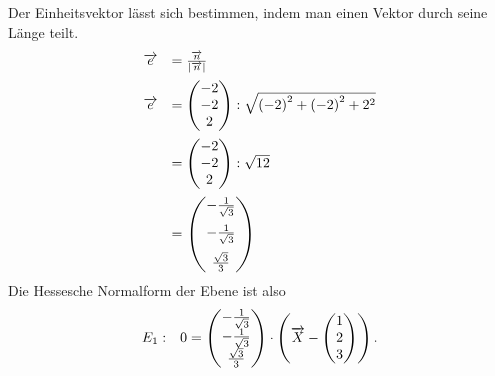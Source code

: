 Der Einheitsvektor lässt sich bestimmen, indem man einen Vektor durch seine Länge teilt.
\begin{equation*}
	\begin{array}{ r l }
		\vec{e} & =\frac{\vec{n}}{| \vec{n}| }\vspace{2mm}\\
		\vec{e} & =\begin{pmatrix}
			-2\\
			-2\\
			2
		\end{pmatrix} :\sqrt{{(-2)}^{2} + {(-2)}^{2} + {2}^{2}}\vspace{2mm}\\
		& =\begin{pmatrix}
			-2\\
			-2\\
			2
		\end{pmatrix} :\sqrt{12}\vspace{2mm}\\
		& =\begin{pmatrix}
			-\frac{1}{\sqrt{3}}\vspace{2mm}\\
			-\frac{1}{\sqrt{3}}\vspace{2mm}\\
			\frac{\sqrt{3}}{3}
		\end{pmatrix}
	\end{array}
\end{equation*}
Die Hessesche Normalform der Ebene ist also
\begin{equation*}
	\begin{array}{ r l }
		E_{1} : & 0=\begin{pmatrix}
			-\frac{1}{\sqrt{3}}\\
			-\frac{1}{\sqrt{3}}\\
			\frac{\sqrt{3}}{3}
		\end{pmatrix} \cdotp \left(\vec{X} -\begin{pmatrix}
			1\\
			2\\
			3
		\end{pmatrix}\right)\text{.}
	\end{array}
\end{equation*}


